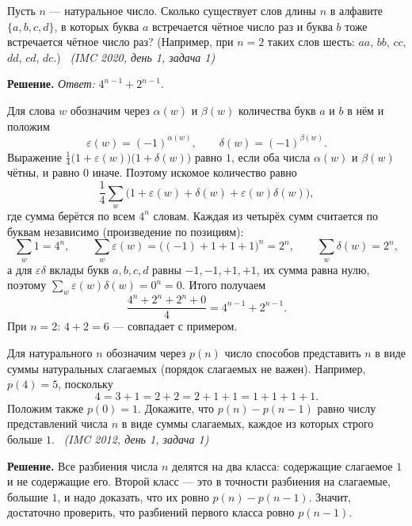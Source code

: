 
\providecommand{\src}[1]{\ \textup{\small\textit{(IMC #1)}}}
\providecommand{\Zh}{\mathbb{Z}}
\providecommand{\Rh}{\mathbb{R}}

\q Пусть $n$ --- натуральное число. Сколько существует слов длины $n$ в алфавите $\{a,b,c,d\}$, в которых буква $a$ встречается чётное число раз и буква $b$ тоже встречается чётное число раз? (Например, при $n=2$ таких слов шесть: $aa$, $bb$, $cc$, $dd$, $cd$, $dc$.)
\src{2020, день 1, задача 1}

\if{}
\textbf{Решение.} \emph{Ответ:} $4^{n-1}+2^{n-1}$.

Для слова $w$ обозначим через $\alpha(w)$ и $\beta(w)$ количества букв $a$ и $b$ в нём и положим
\[
\varepsilon(w)=(-1)^{\alpha(w)},\qquad \delta(w)=(-1)^{\beta(w)}.
\]
Выражение $\tfrac14\bigl(1+\varepsilon(w)\bigr)\bigl(1+\delta(w)\bigr)$ равно $1$, если оба числа $\alpha(w)$ и $\beta(w)$ чётны, и равно $0$ иначе. Поэтому искомое количество равно
\[
\frac14\sum_{w}\bigl(1+\varepsilon(w)+\delta(w)+\varepsilon(w)\delta(w)\bigr),
\]
где сумма берётся по всем $4^n$ словам. Каждая из четырёх сумм считается по буквам независимо (произведение по позициям):
\[
\sum_w 1=4^n,\qquad
\sum_w\varepsilon(w)=\bigl((-1)+1+1+1\bigr)^n=2^n,\qquad
\sum_w\delta(w)=2^n,
\]
а для $\varepsilon\delta$ вклады букв $a,b,c,d$ равны $-1,-1,+1,+1$, их сумма равна нулю, поэтому $\sum_w\varepsilon(w)\delta(w)=0^n=0$. Итого получаем
\[
\frac{4^n+2^n+2^n+0}{4}=4^{n-1}+2^{n-1}.
\]
При $n=2$: $4+2=6$ --- совпадает с примером.
\fi

\q Для натурального $n$ обозначим через $p(n)$ число способов представить $n$ в виде суммы натуральных слагаемых (порядок слагаемых не важен). Например, $p(4)=5$, поскольку
\[
4=3+1=2+2=2+1+1=1+1+1+1 .
\]
Положим также $p(0)=1$. Докажите, что $p(n)-p(n-1)$ равно числу представлений числа $n$ в виде суммы слагаемых, каждое из которых строго больше $1$.
\src{2012, день 1, задача 1}

\if{}
\textbf{Решение.} Все разбиения числа $n$ делятся на два класса: содержащие слагаемое $1$ и не содержащие его. Второй класс --- это в точности разбиения на слагаемые, большие $1$, и надо доказать, что их ровно $p(n)-p(n-1)$. Значит, достаточно проверить, что разбиений первого класса ровно $p(n-1)$.


